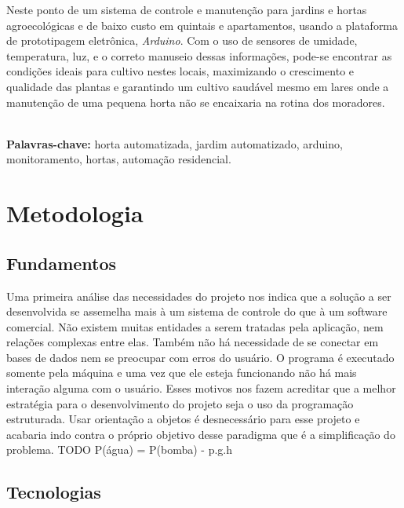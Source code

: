 \documentclass[a4paper,12pt]{article}
\begin{document}
Neste ponto  de um sistema de controle e manutenção para jardins e hortas agroecológicas e de baixo custo em quintais e apartamentos, usando a plataforma de prototipagem eletrônica, \textit{Arduino}. Com o uso de sensores de umidade, temperatura, luz, e o correto manuseio dessas informações, pode-se encontrar as condições ideais para cultivo nestes locais, maximizando o crescimento e qualidade das plantas e garantindo um cultivo saudável mesmo em lares onde a manutenção de uma pequena horta não se encaixaria na rotina dos moradores.

\textbf{\\Palavras-chave:} horta automatizada, jardim automatizado, arduino, monitoramento, hortas, automação residencial.


\newpage
\section{Metodologia}
\subsection{Fundamentos}

Uma primeira análise das necessidades do projeto nos indica que a solução a ser desenvolvida se assemelha mais à um sistema de controle do que à um software comercial. Não existem muitas entidades a serem tratadas pela aplicação, nem relações complexas entre elas. Também não há necessidade de se conectar em bases de dados nem se preocupar com erros do usuário. O programa é executado somente pela máquina e uma vez que ele esteja funcionando não há mais interação alguma com o usuário. Esses motivos nos fazem acreditar que a melhor estratégia para o desenvolvimento do projeto seja o uso da programação estruturada. Usar orientação a objetos é desnecessário para esse projeto e acabaria indo contra o próprio objetivo desse paradigma que é a simplificação do problema. TODO P(água) = P(bomba) - p.g.h
\subsection{Tecnologias}
\end{document}
